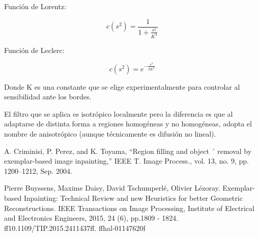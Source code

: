 \documentclass[conference]{IEEEtran}
\begin{document}
Función de Lorentz:

\[
  c(s^2) = \frac{1}{1+ \frac{s^2}{K^2}}
\]

Función de Leclerc:

\[
  c(s^2) = e^{-\frac{s^2}{2K^2}}
\]

Donde K es una constante que se elige experimentalmente para controlar al sensibilidad ante los bordes.

 El filtro que se aplica es isotrópico localmente pero la diferencia es que al adaptarse de distinta forma a regiones homogéneas y no homogéneas, adopta el nombre de anisotrópico (aunque técnicamente es difusión no lineal). 



\begin{thebibliography}{00}
 A. Criminisi, P. Perez, and K. Toyama, “Region filling and object ´
removal by exemplar-based image inpainting,” IEEE T. Image Process.,
vol. 13, no. 9, pp. 1200–1212, Sep. 2004.

 Pierre Buyssens, Maxime Daisy, David Tschumperlé, Olivier Lézoray. Exemplar-based Inpainting:
Technical Review and new Heuristics for better Geometric Reconstructions. IEEE Transactions on
Image Processing, Institute of Electrical and Electronics Engineers, 2015, 24 (6), pp.1809 - 1824.
ff10.1109/TIP.2015.2411437ff. ffhal-01147620f
\end{thebibliography}
\end{document}
